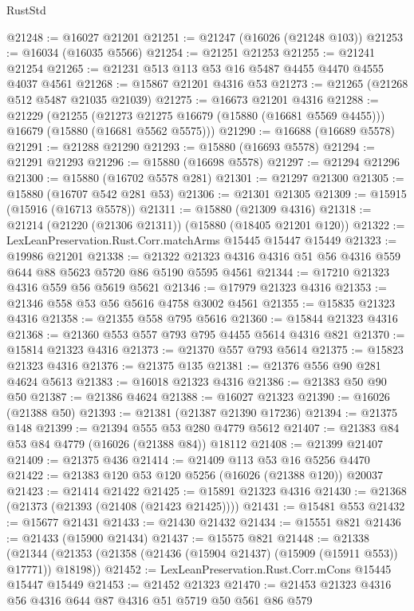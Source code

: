 \begin{lexlean}{RustStd}
\begin{coremodule}
@21248 := @16027 @21201
@21251 := @21247 (@16026 (@21248 @103))
@21253 := @16034 (@16035 @5566)
@21254 := @21251 @21253
@21255 := @21241 @21254
@21265 := @21231 @513 @113 @53 @16 @5487 @4455 @4470 @4555 @4037 @4561
@21268 := @15867 @21201 @4316 @53
@21273 := @21265 (@21268 @512 @5487 @21035 @21039)
@21275 := @16673 @21201 @4316
@21288 := @21229
    (@21255
      (@21273 @21275 @16679 (@15880 (@16681 @5569 @4455)))
      @16679
      (@15880 (@16681 @5562 @5575)))
@21290 := @16688 (@16689 @5578)
@21291 := @21288 @21290
@21293 := @15880 (@16693 @5578)
@21294 := @21291 @21293
@21296 := @15880 (@16698 @5578)
@21297 := @21294 @21296
@21300 := @15880 (@16702 @5578 @281)
@21301 := @21297 @21300
@21305 := @15880 (@16707 @542 @281 @53)
@21306 := @21301 @21305
@21309 := @15915 (@15916 (@16713 @5578))
@21311 := @15880 (@21309 @4316)
@21318 := @21214 (@21220 (@21306 @21311)) (@15880 (@18405 @21201 @120))
@21322 := LexLeanPreservation.Rust.Corr.matchArms @15445 @15447 @15449
@21323 := @19986 @21201
@21338 := @21322 @21323 @4316 @4316 @51 @56 @4316 @559 @644 @88 @5623 @5720 @86 @5190 @5595 @4561
@21344 := @17210 @21323 @4316 @559 @56 @5619 @5621
@21346 := @17979 @21323 @4316
@21353 := @21346 @558 @53 @56 @5616 @4758 @3002 @4561
@21355 := @15835 @21323 @4316
@21358 := @21355 @558 @795 @5616
@21360 := @15844 @21323 @4316
@21368 := @21360 @553 @557 @793 @795 @4455 @5614 @4316 @821
@21370 := @15814 @21323 @4316
@21373 := @21370 @557 @793 @5614
@21375 := @15823 @21323 @4316
@21376 := @21375 @135
@21381 := @21376 @556 @90 @281 @4624 @5613
@21383 := @16018 @21323 @4316
@21386 := @21383 @50 @90 @50
@21387 := @21386 @4624
@21388 := @16027 @21323
@21390 := @16026 (@21388 @50)
@21393 := @21381 (@21387 @21390 @17236)
@21394 := @21375 @148
@21399 := @21394 @555 @53 @280 @4779 @5612
@21407 := @21383 @84 @53 @84 @4779 (@16026 (@21388 @84)) @18112
@21408 := @21399 @21407
@21409 := @21375 @436
@21414 := @21409 @113 @53 @16 @5256 @4470
@21422 := @21383 @120 @53 @120 @5256 (@16026 (@21388 @120)) @20037
@21423 := @21414 @21422
@21425 := @15891 @21323 @4316
@21430 := @21368 (@21373 (@21393 (@21408 (@21423 @21425))))
@21431 := @15481 @553
@21432 := @15677 @21431
@21433 := @21430 @21432
@21434 := @15551 @821
@21436 := @21433 (@15900 @21434)
@21437 := @15575 @821
@21448 := @21338
    (@21344 (@21353 (@21358 (@21436 (@15904 @21437) (@15909 (@15911 @553)) @17771)) @18198))
@21452 := LexLeanPreservation.Rust.Corr.mCons @15445 @15447 @15449
@21453 := @21452 @21323
@21470 := @21453
    @21323
    @4316
    @56
    @4316
    @644
    @87
    @4316
    @51
    @5719
    @50
    @561
    @86
    @579

\end{coremodule}
\end{lexlean}
